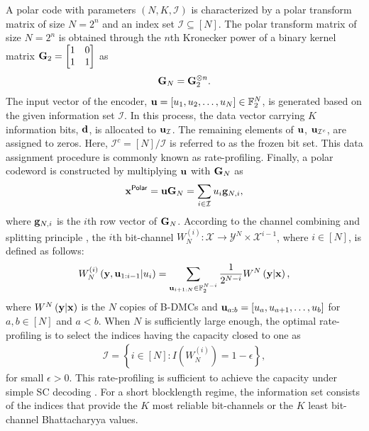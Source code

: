 \documentclass[conference]{IEEEtran}
\begin{document}
A polar code with parameters $(N,K,\mathcal{I})$ is characterized by a polar transform matrix of size $N=2^n$ and an index set $\mathcal{I}\subseteq [N]$. The polar transform matrix of size $N=2^n$ is obtained through the $n$th Kronecker power of a binary kernel matrix ${\bf G}_2=\begin{bmatrix}
1 & 0\\
1 & 1 
\end{bmatrix}$ as
 \begin{align}
	{\bf G}_N = {\bf G}_2^{\otimes n}.
\end{align}
The input vector of the encoder, ${\bf u}=[u_1,u_2,\ldots, u_N] \in \mathbb{F}_2^N$, is generated based on the given information set $\mathcal{I}$. In this process, the data vector carrying $K$ information bits, ${\bf d}$, is allocated to ${\bf u}_{\mathcal{I}}$. The remaining elements of ${\bf u}$, ${\bf u}_{\mathcal{I}^c}$, are assigned to zeros. Here, $\mathcal{I}^c=[N]/\mathcal{I}$ is referred to as the frozen bit set. This data assignment procedure is commonly known as rate-profiling. Finally, a polar codeword is constructed by multiplying ${\bf u}$ with ${\bf G}_N$ as 
\begin{align}
	{\bf x}^{\sf Polar}={\bf u}{\bf G}_N=\sum_{i\in \mathcal{I}} u_i {\bf g}_{N,i},
\end{align}
where ${\bf g}_{N,i}$ is the $i$th row vector of ${\bf G}_N$. According to the channel combining and splitting principle \cite{arikan-polar}, the $i$th bit-channel $W_N^{(i)}: \mathcal{X}\rightarrow \mathcal{Y}^N\times \mathcal{X}^{i-1}$, where $i\in [N]$, is defined as follows:
\begin{align}
    W_N^{(i)}\left({\bf y}, {\bf u}_{1:i-1} | u_i\right) = \sum_{{\bf u}_{i+1:N} \in \mathbb{F}_2^{N-i}} \frac{1}{2^{N-i}} W^N\left({\bf y}  | {\bf x}\right),
\end{align}
where $W^N\left({\bf y} | {\bf x}\right)$ is the  $N$ copies of B-DMCs and ${\bf u}_{a:b}=[u_a,u_{a+1},\ldots, u_{b}]$ for $a,b\in [N]$ and $a<b$. When $N$ is sufficiently large enough, the optimal rate-profiling is to select the indices having the capacity closed to one as
\begin{align}
	\mathcal{I}=\left\{ i\in [N] : I\left(W_N^{(i)} \right) =1-\epsilon \right\},
\end{align}
for small $\epsilon>0$.  This rate-profiling is sufficient to achieve the capacity under simple SC decoding \cite{arikan-polar}.  For a short blocklength regime, the information set consists of the indices that provide the $K$ most reliable bit-channels or the $K$ least bit-channel Bhattacharyya values.
\end{document}
